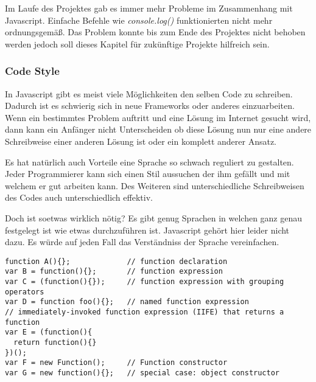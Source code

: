 
Im Laufe des Projektes gab es immer mehr Probleme im Zusammenhang mit Javascript. Einfache Befehle wie \textit{console.log()} funktionierten nicht mehr ordnungsgemäß. Das Problem konnte bis zum Ende des Projektes nicht behoben werden jedoch soll dieses Kapitel für zukünftige Projekte hilfreich sein.

\subsubsection{Code Style}
In Javascript gibt es meist viele Möglichkeiten den selben Code zu schreiben. Dadurch ist es schwierig sich in neue Frameworks oder anderes einzuarbeiten. Wenn ein bestimmtes Problem auftritt und eine Lösung im Internet gesucht wird, dann kann ein Anfänger nicht Unterscheiden ob diese Lösung nun nur eine andere Schreibweise einer anderen Lösung ist oder ein komplett anderer Ansatz. 

Es hat natürlich auch Vorteile eine Sprache so schwach reguliert zu gestalten. Jeder Programmierer kann sich einen Stil aussuchen der ihm gefällt und mit welchem er gut arbeiten kann. Des Weiteren sind unterschiedliche Schreibweisen des Codes auch unterschiedlich effektiv. 

Doch ist soetwas wirklich nötig? Es gibt genug Sprachen in welchen ganz genau festgelegt ist wie etwas durchzuführen ist. Javascript gehört hier leider nicht dazu. Es würde auf jeden Fall das Verständniss der Sprache vereinfachen. 

\begin{lstlisting}[caption = Unterschiedliche Möglichkeiten eine Funktion zu deklarieren\cite{JSOP1}, label = jsopfn]
function A(){};             // function declaration
var B = function(){};       // function expression
var C = (function(){});     // function expression with grouping operators
var D = function foo(){};   // named function expression
// immediately-invoked function expression (IIFE) that returns a function
var E = (function(){ 
  return function(){}
})();
var F = new Function();     // Function constructor
var G = new function(){};   // special case: object constructor

\end{lstlisting}

\newpage

